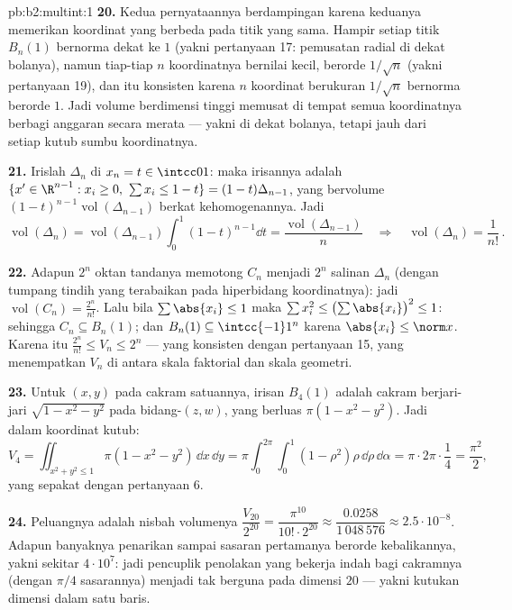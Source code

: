 \begin{solution}{pb:b2:multint:1}
\textbf{20.} Kedua pernyataannya berdampingan karena keduanya memerikan
koordinat yang berbeda pada titik yang sama. Hampir setiap titik
$B_n(1)$ bernorma dekat ke $1$ (yakni pertanyaan 17: pemusatan
radial di dekat bolanya), namun tiap-tiap $n$
koordinatnya bernilai kecil, berorde $1/\sqrt n$ (yakni pertanyaan 19),
dan itu konsisten karena $n$ koordinat berukuran $1/\sqrt n$
bernorma berorde $1$. Jadi volume berdimensi tinggi memusat
di tempat semua koordinatnya berbagi anggaran  secara merata ---
yakni di dekat bolanya, tetapi jauh dari setiap kutub sumbu koordinatnya.

\textbf{21.} Irislah $\Delta_n$ di $x_n = t \in \intcc01$: maka
irisannya adalah $\{x' \in \R^{n-1} : x_i \geq 0,\ \sum x_i \leq 1 -
t\} = (1-t)\Delta_{n-1}$, yang bervolume
$(1-t)^{n-1}\operatorname{vol}(\Delta_{n-1})$ berkat kehomogenannya.
Jadi
\[
\operatorname{vol}(\Delta_n) =
\operatorname{vol}(\Delta_{n-1})\int_0^1(1 - t)^{n-1}\dd t =
\frac{\operatorname{vol}(\Delta_{n-1})}{n}
\quad\Longrightarrow\quad
\operatorname{vol}(\Delta_n) = \frac1{n!}\,.
\]

\textbf{22.} Adapun $2^n$ oktan tandanya memotong $C_n$ menjadi $2^n$
salinan $\Delta_n$ (dengan tumpang tindih yang terabaikan pada
hiperbidang koordinatnya): jadi $\operatorname{vol}(C_n) = \frac{2^n}{n!}$. Lalu bila
$\sum\abs{x_i} \leq 1$ maka $\sum x_i^2 \leq
\bigl(\sum\abs{x_i}\bigr)^2 \leq 1$: sehingga $C_n \subseteq B_n(1)$;
dan $B_n(1) \subseteq \intcc{-1}1^n$ karena $\abs{x_i} \leq
\norm x$. Karena itu $\frac{2^n}{n!} \leq V_n \leq 2^n$ ---
yang konsisten dengan pertanyaan 15, yang menempatkan $V_n$ di antara skala
faktorial dan skala geometri.

\textbf{23.} Untuk $(x, y)$ pada cakram satuannya, irisan
$B_4(1)$ adalah cakram berjari-jari $\sqrt{1 - x^2 - y^2}$ pada
bidang-$(z, w)$, yang berluas $\pi(1 - x^2 - y^2)$. Jadi dalam koordinat
kutub:
\[
V_4 = \iint_{x^2+y^2\leq1}\pi(1 - x^2 - y^2)\,\dd x\,\dd y
= \pi\int_0^{2\pi}\!\!\int_0^1(1 - \rho^2)\rho\,
\dd\rho\,\dd\alpha
= \pi\cdot2\pi\cdot\frac14 = \frac{\pi^2}2 ,
\]
yang sepakat dengan pertanyaan 6.

\textbf{24.} Peluangnya adalah nisbah volumenya
$\dfrac{V_{20}}{2^{20}} = \dfrac{\pi^{10}}{10!\cdot2^{20}}
\approx \dfrac{0.0258}{1\,048\,576} \approx
2.5\cdot10^{-8}$. Adapun banyaknya penarikan sampai sasaran pertamanya
berorde kebalikannya, yakni sekitar $4\cdot10^7$: jadi pencuplik penolakan
yang bekerja indah bagi cakramnya (dengan $\pi/4$ sasarannya) menjadi
tak berguna pada dimensi $20$ --- yakni kutukan dimensi dalam
satu baris.


\end{solution}
